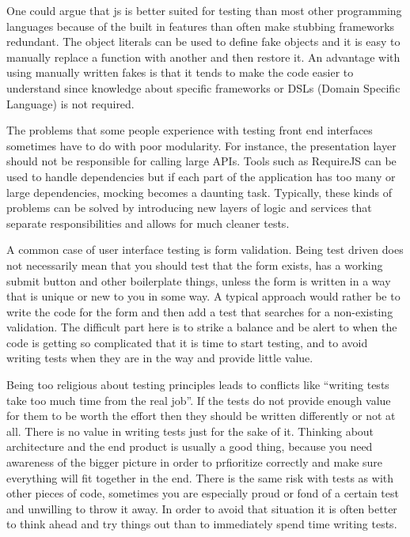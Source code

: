 \documentclass[11pt]{article}
\begin{document}
One could argue that \gls{js} is better suited for testing than most other programming languages because of the built in features than often make stubbing frameworks redundant. The object literals can be used to define fake objects and it is easy to manually replace a function with another and then restore it. An advantage with using manually written fakes is that it tends to make the code easier to understand since knowledge about specific frameworks or DSLs (Domain Specific Language) is not required. \cite[questions~20-21]{Edelstam}\label{LiteralFakes}

The problems that some people experience with testing front end interfaces sometimes have to do with poor modularity. For instance, the presentation layer should not be responsible for calling large APIs. Tools such as RequireJS can be used to handle dependencies but if each part of the application has too many or large dependencies, mocking becomes a daunting task. Typically, these kinds of problems can be solved by introducing new layers of logic and services that separate responsibilities and allows for much cleaner tests. \cite[question~23]{Edelstam}

A common case of user interface testing is form validation. Being test driven does not necessarily mean that you should test that the form exists, has a working submit button and other boilerplate things, unless the form is written in a way that is unique or new to you in some way. A typical approach would rather be to write the code for the form and then add a test that searches for a non-existing validation. The difficult part here is to strike a balance and be alert to when the code is getting so complicated that it is time to start testing, and to avoid writing tests when they are in the way and provide little value. \cite[questions~24-25]{Edelstam}

Being too religious about testing principles leads to conflicts like ``writing tests take too much time from the real job''. If the tests do not provide enough value for them to be worth the effort then they should be written differently or not at all. There is no value in writing tests just for the sake of it. Thinking about architecture and the end product is usually a good thing, because you need awareness of the bigger picture in order to prfioritize correctly and make sure everything will fit together in the end. There is the same risk with tests as with other pieces of code, sometimes you are especially proud or fond of a certain test and unwilling to throw it away. In order to avoid that situation it is often better to think ahead and try things out than to immediately spend time writing tests. \cite[question~27]{Edelstam}
\end{document}
